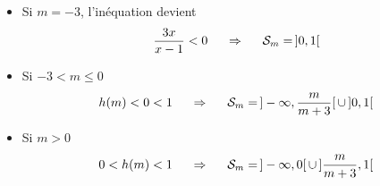 \begin{enumerate}
\begin{itemize}
  \item Si $m=-3$, l'inéquation devient
\begin{displaymath}
  \frac{3x}{x-1}<0  \hspace{0.5cm}\Rightarrow \hspace{0.5cm} \mathcal{S}_m = \,]0, 1[
\end{displaymath}

  \item Si $-3 < m \leq 0$
\begin{displaymath}
h(m) < 0 < 1 \hspace{0.5cm}\Rightarrow \hspace{0.5cm} \mathcal{S}_m =\, ]-\infty, \frac{m}{m+3}[\, \cup \, ]0,1[   
\end{displaymath}

  \item Si $m>0$
\begin{displaymath}
0 < h(m) < 1 \hspace{0.5cm}\Rightarrow \hspace{0.5cm} \mathcal{S}_m =\, ]-\infty,0[\, \cup \, ]\frac{m}{m+3},1 [   
\end{displaymath}
\end{itemize}


\end{enumerate}
